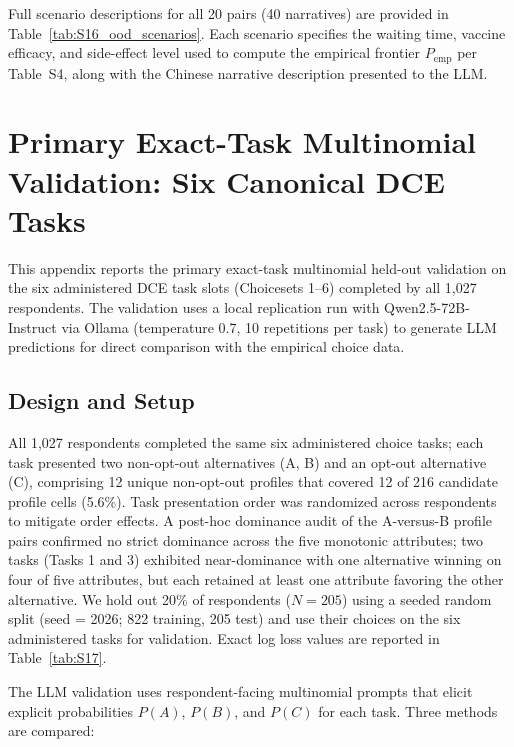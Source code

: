 \documentclass[11pt]{article}
\begin{document}
Full scenario descriptions for all 20 pairs (40 narratives) are provided in Table~\ref{tab:S16_ood_scenarios}. Each scenario specifies the waiting time, vaccine efficacy, and side-effect level used to compute the empirical frontier $P_{\text{emp}}$ per Table~S4, along with the Chinese narrative description presented to the LLM.




\section{Primary Exact-Task Multinomial Validation: Six Canonical DCE Tasks}
\label{app:exact_task}
\label{app:multinom_validation}

This appendix reports the primary exact-task multinomial held-out validation on the six administered DCE task slots (Choicesets 1--6) completed by all 1,027 respondents. The validation uses a local replication run with Qwen2.5-72B-Instruct via Ollama (temperature 0.7, 10 repetitions per task) to generate LLM predictions for direct comparison with the empirical choice data.

\subsection{Design and Setup}

All 1,027 respondents completed the same six administered choice tasks; each task presented two non-opt-out alternatives (A, B) and an opt-out alternative (C), comprising 12 unique non-opt-out profiles that covered 12 of 216 candidate profile cells (5.6\%). Task presentation order was randomized across respondents to mitigate order effects. A post-hoc dominance audit of the A-versus-B profile pairs confirmed no strict dominance across the five monotonic attributes; two tasks (Tasks 1 and 3) exhibited near-dominance with one alternative winning on four of five attributes, but each retained at least one attribute favoring the other alternative. We hold out 20\% of respondents ($N = 205$) using a seeded random split (seed = 2026; 822 training, 205 test) and use their choices on the six administered tasks for validation. Exact log loss values are reported in Table~\ref{tab:S17}.

The LLM validation uses respondent-facing multinomial prompts that elicit explicit probabilities $P(A)$, $P(B)$, and $P(C)$ for each task. Three methods are compared:
\end{document}
